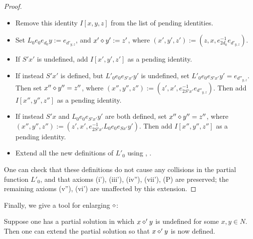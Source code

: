 \begin{proof}
\begin{itemize}
\item Remove this identity $I[x,y,z]$ from the list of pending identities.
\item Set $L_0 e_0 e_{d_0} y := e_{d'_{y,z}}$, and $x' \diamond y' := z'$, where $(x',y',z') := (z, x, e_{2d_0}^{-1} e_{d'_{y,z}})$.
\item If $S'x'$ is undefined, add $I[x',y',z']$ as a pending identity.
\item If instead $S'x'$ is defined, but $L'_0 e_0 e_{S'x'} y'$ is undefined, set $L'_0 e_0 e_{S'x'} y' = e_{d''_{y,z}}$.  Then set $x'' \diamond y'' = z''$, where $(x'',y'',z'') := (z', x', e_{2S'x'}^{-1} e_{d''_{y,z}})$.  Then add $I[x'',y'',z'']$ as a pending identity.
\item If instead $S' x$ and $L_0 e_0 e_{S'x'} y'$ are both defined, set $x'' \diamond y'' = z''$, where $(x'',y'',z'') := (z', x', e_{2S'x'}^{-1} L_0 e_0 e_{Sx'} y')$.  Then add $I[x'',y'',z'']$ as a pending identity.
\item Extend all the new definitions of $L'_0$ using , .
\end{itemize}
One can check that these definitions do not cause any collisions in the partial function $L'_0$, and that axioms (i'), (iii'), (iv''), (vii'), (P) are preserved; the remaining axioms (v''), (vi') are unaffected by this extension.
\end{proof}

Finally, we give a tool for enlarging $\op$:

\begin{proposition}[Enlarging $\op$]\label{enlarge-op}\leanok  Suppose one has a partial solution in which $x \diamond' y$ is undefined for some $x,y \in N$.  Then one can extend the partial solution so that $x \diamond' y$ is now defined.
\end{proposition}

